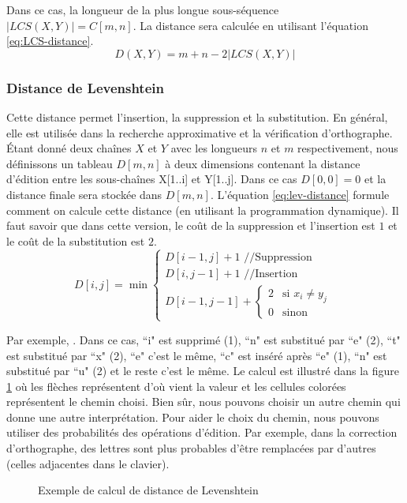 \documentclass{KodeBook}
\begin{document}
Dans ce cas, la longueur de la plus longue sous-séquence $|LCS(X, Y)| = C[m, n]$.
La distance sera calculée en utilisant l'équation \ref{eq:LCS-distance}.
\begin{equation}
	D(X, Y) = m + n - 2 |LCS(X, Y)|
	\label{eq:LCS-distance}
\end{equation}

\subsubsection{Distance de Levenshtein}

Cette distance permet l'insertion, la suppression et la substitution.
En général, elle est utilisée dans la recherche approximative et la vérification d'orthographe.
Étant donné deux chaînes $X$ et $Y$ avec les longueurs $n$ et $m$ respectivement, nous définissons un tableau $D[m, n]$ à deux dimensions contenant la distance d'édition entre les sous-chaînes X[1..i] et Y[1..j]. 
Dans ce cas $D[0, 0] = 0$ et la distance finale sera stockée dans $D[m, n]$.
L'équation \ref{eq:lev-distance} formule comment on calcule cette distance (en utilisant la programmation dynamique).
Il faut savoir que dans cette version, le coût de la suppression et l'insertion est $1$ et le coût de la substitution est $2$.
\begin{equation}
	D[i, j] = \min 
	\begin{cases}
		D[i - 1, j] + 1 \text{ //Suppression}\\
		D[i, j-1] + 1 \text{ //Insertion}\\
		D[i-1, j-1] + \begin{cases}
			2 & \text{si } x_i \ne y_j \\
			0 & \text{sinon}
		\end{cases}
	\end{cases}
	\label{eq:lev-distance}
\end{equation}

Par exemple, . 
Dans ce cas, ``i" est supprimé (1), ``n" est substitué par ``e" (2), ``t" est substitué par ``x" (2), ``e" c'est le même, ``c" est inséré après ``e" (1), ``n" est substitué par ``u" (2) et le reste c'est le même.
Le calcul est illustré dans la figure \ref{fig:laven-distance} où les flèches représentent d'où vient la valeur et les cellules colorées représentent le chemin choisi.
Bien sûr, nous pouvons choisir un autre chemin qui donne une autre interprétation.
Pour aider le choix du chemin, nous pouvons utiliser des probabilités des opérations d'édition.
Par exemple, dans la correction d'orthographe, des lettres sont plus probables d'être remplacées par d'autres (celles adjacentes dans le clavier).
\begin{figure}[ht]
	\centering
	\caption[Exemple de calcul de distance de Levenshtein]{Exemple de calcul de distance de Levenshtein \cite{2019-jurafsky-martin} \label{fig:laven-distance}}
\end{figure}
\end{document}
